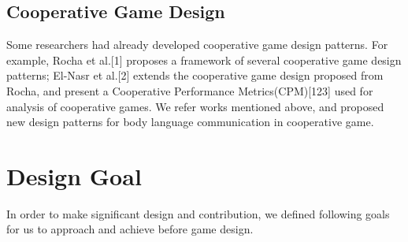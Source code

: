 \documentclass{sigchi}
\begin{document}
\subsection{Cooperative Game Design}
Some researchers had already developed cooperative game design patterns. For example, Rocha et al.[1] proposes a framework of several cooperative game design patterns; El-Nasr et al.[2] extends the cooperative game design proposed from Rocha, and present a Cooperative Performance Metrics(CPM)[123] used for analysis of cooperative games. We refer works mentioned above, and proposed new design patterns for body language communication in cooperative game.

\section{Design Goal}
In order to make significant design and contribution, we defined following goals for us to approach and achieve before game design.
\end{document}
